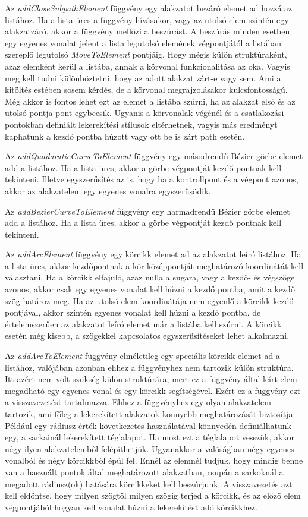 \documentclass[12pt]{report}
\theoremstyle{definition}
\newcommand{\func}[1]{{\textsl{#1}}}
\begin{document}
Az \func{addCloseSubpathElement} függvény egy alakzatot bezáró elemet ad hozzá
az listához. Ha a lista üres a függvény hívásakor, vagy az utolsó elem szintén
egy alakzatzáró, akkor a függvény mellőzi a beszúrást. A beszúrás minden
esetben egy egyenes vonalat jelent a lista legutolsó elemének végpontjától a
listában szereplő legutolsó \func{MoveToElement} pontjáig. Hogy mégis külön
struktúraként, azaz elemként kerül a listába, annak a körvonal funkcionalitása
az oka. Vagyis meg kell tudni különböztetni, hogy az adott alakzat zárt-e vagy
sem. Ami a kitöltés estében sosem kérdés, de a körvonal megrajzolásakor
kulcsfontosságú. Még akkor is fontos lehet ezt az elemet a listába szúrni, ha
az alakzat első és az utolsó pontja pont egybeesik. Ugyanis a körvonalak
végénél és a csatlakozási pontokban definiált lekerekítési stílusok
eltérhetnek, vagyis más eredményt kaphatunk a kezdő pontba húzott vagy ott be
is zárt path esetén.

Az \func{addQuadaraticCurveToElement} függvény egy másodrendű Bézier görbe
elemet add a listához. Ha a lista üres, akkor a görbe végpontját kezdő pontnak
kell tekinteni. Illetve egyszerűsítés az is, hogy ha a kontrollpont és a
végpont azonos, akkor az alakzatelem egy egyenes vonalra egyszerűsödik.

Az \func{addBezierCurveToElement} függvény egy harmadrendű Bézier görbe elemet
add a listához. Ha a lista üres, akkor a görbe végpontját kezdő pontnak kell
tekinteni.

Az \func{addArcElement} függvény egy körcikk elemet ad az alakzatot leíró
listához. Ha a lista üres, akkor kezdőpontnak a kör középpontját meghatározó
koordinátát kell választani. Ha a körcikk elfajuló, azaz nulla a sugara, vagy a
kezdő- és végszöge azonos, akkor csak egy egyenes vonalat kell húzni a kezdő
pontba, amit a kezdő szög határoz meg. Ha az utolsó elem koordinátája nem
egyenlő a körcikk kezdő pontjával, akkor szintén egyenes vonalat kell húzni a
kezdő pontba, de értelemszerűen az alakzatot leíró elemet már a listába kell
szúrni. A körcikk esetén még kisebb, a szögekkel kapcsolatos egyszerűsítéseket
lehet alkalmazni.

Az \func{addArcToElement} függvény elméletileg egy speciális körcikk elemet ad
a listához, valójában azonban ehhez a függvényhez nem tartozik külön struktúra.
Itt azért nem volt szükség külön struktúrára, mert ez a függvény által leírt
elem megadható egy egyenes vonal és egy körcikk segítségével. Ezért ez a
függvény ezt a visszavezetést tartalmazza. Ehhez a függvényhez egy olyan
alakzatelem tartozik, ami főleg a lekerekített alakzatok könnyebb
meghatározását biztosítja. Például egy rádiusz érték következetes használatával
könnyedén definiálhatunk egy, a sarkainál lekerekített téglalapot. Ha most ezt
a téglalapot vesszük, akkor négy ilyen alakzatelemből felépíthetjük. Ugyanakkor
a valóságban négy egyenes vonalból és négy körcikkből épül fel. Ennél az
elemnél tudjuk, hogy mindig benne van a használt pontok által meghatározott
alakzatban, csupán a sarkoknál a megadott rádiusz(ok) hatására körcikkeket kell
beszúrjunk. A visszavezetés azt kell eldöntse, hogy milyen szögtől milyen
szögig terjed a körcikk, és az előző elem végpontjából hogyan kell vonalat
húzni a lekerekítést adó körcikkhez.
\end{document}

